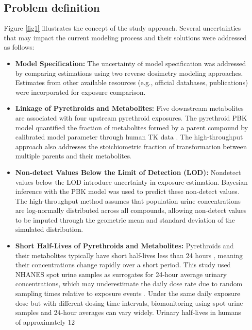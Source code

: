 \documentclass[toxics,article,submit,pdftex,moreauthors]{Definitions/mdpi}
\begin{document}
\subsection{Problem definition}\label{problem-definition}

Figure \ref{fig1} illustrates the concept of the study approach. Several
uncertainties that may impact the current modeling process and their solutions
were addressed as follows:

\begin{itemize}
\item
  \textbf{Model Specification:} The uncertainty of model specification
  was addressed by comparing estimations using two reverse dosimetry
  modeling approaches. Estimates from other available resources (e.g.,
  official databases, publications) were incorporated for exposure
  comparison.
\item
  \textbf{Linkage of Pyrethroids and Metabolites:} Five downstream
  metabolites are associated with four upstream pyrethroid exposures.
  The pyrethroid PBK model quantified the fraction of metabolites formed
  by a parent compound by calibrated model parameter through human TK
  data \citep{quindroit2019estimating}. The high-throughput approach
  also addresses the stoichiometric fraction of transformation between
  multiple parents and their metabolites.
\item
  \textbf{Non-detect Values Below the Limit of Detection (LOD):}
  Nondetect values below the LOD introduce uncertainty in exposure
  estimation. Bayesian inference with the PBK model was used to predict
  these non-detect values. The high-throughput method assumes that
  population urine concentrations are log-normally distributed across
  all compounds, allowing non-detect values to be imputed through the
  geometric mean and standard deviation of the simulated distribution.
\item
  \textbf{Short Half-Lives of Pyrethroids and Metabolites:} Pyrethroids
  and their metabolites typically have short half-lives less than 24
  hours \citep{hays2007biomonitoring}, meaning their concentrations
  change rapidly over a short period. This study used NHANES spot urine
  samples as surrogates for 24-hour average urinary concentrations,
  which may underestimate the daily dose rate due to random sampling
  times relative to exposure events \citep{aylward_interpreting_2012}.
  Under the same daily exposure dose but with different dosing time
  intervals, biomonitoring using spot urine samples and 24-hour averages
  can vary widely. Urinary half-lives in humans of approximately 12

\end{itemize}
\end{document}
